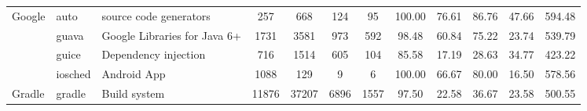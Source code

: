 \begin{table*}[]
{\begin{tabular}{lllccccccccc}
\multirow{4}{*}{Google}     & auto                                                          & source code generators                                                   & 257            & 668             & 124                                                              & 95             & 100.00         & 76.61          & 86.76          & 47.66                                                                                 & 594.48                                               \\
                            & guava                                                         & Google Libraries for Java 6+                                             & 1731           & 3581            & 973                                                              & 592            & 98.48          & 60.84          & 75.22          & 23.74                                                                                 & 539.79                                               \\
                            & guice                                                         & Dependency injection                                                     & 716            & 1514            & 605                                                              & 104            & 85.58          & 17.19          & 28.63          & 34.77                                                                                 & 423.22                                               \\
                            & iosched                                                       & Android App                                                              & 1088           & 129             & 9                                                                & 6              & 100.00         & 66.67          & 80.00          & 16.50                                                                                 & 578.56                                               \\ \hline
Gradle                      & gradle                                                        & Build system                                                             & 11876          & 37207           & 6896                                                             & 1557           & 97.50          & 22.58          & 36.67          & 23.58                                                                                 & 500.55                                               \\ \hline

\end{tabular}}
\end{table*}
